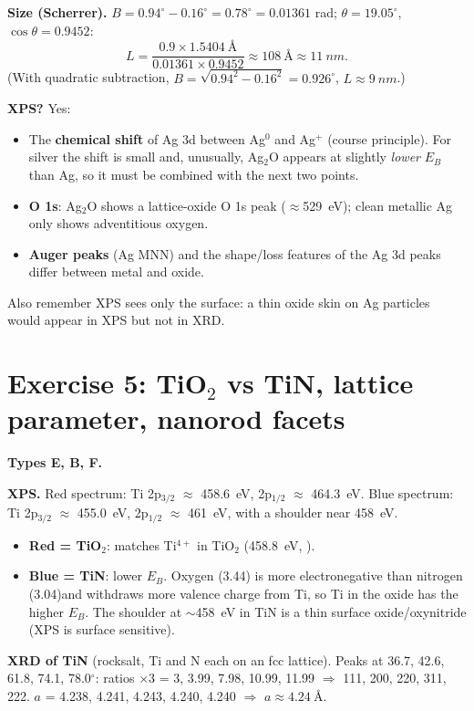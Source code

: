 \textbf{Size (Scherrer).} $B = 0.94^\circ - 0.16^\circ = 0.78^\circ = 0.01361$ rad; $\theta = 19.05^\circ$,
$\cos\theta = 0.9452$:
\[
L = \frac{0.9\times\SI{1.5404}{\angstrom}}{0.01361\times0.9452} \approx \SI{108}{\angstrom} \approx \boxed{\SI{11}{nm}}.
\]
(With quadratic subtraction, $B=\sqrt{0.94^2-0.16^2}=0.926^\circ$, $L\approx\SI{9}{nm}$\extra.)

\textbf{XPS?} Yes:
\begin{itemize}
  \item The \textbf{chemical shift} of Ag 3d between Ag$^0$ and Ag$^+$ (course principle). For silver the shift is small and,
        unusually, Ag$_2$O appears at slightly \emph{lower} $E_B$ than Ag\extra, so it must be combined with the next two points.
  \item \textbf{O 1s}: Ag$_2$O shows a lattice-oxide O 1s peak ($\approx$\SI{529}{eV}\extra); clean metallic Ag only shows
        adventitious oxygen.
  \item \textbf{Auger peaks} (Ag MNN) and the shape/loss features of the Ag 3d peaks differ between metal and oxide\extra.
\end{itemize}
Also remember XPS sees only the surface: a thin oxide skin on Ag particles would appear in XPS but not in XRD.

\section{Exercise 5: TiO$_2$ vs TiN, lattice parameter, nanorod facets}
\textbf{Types E, B, F.}

\textbf{XPS.} Red spectrum: Ti 2p$_{3/2}$ $\approx$ \SI{458.6}{eV}, 2p$_{1/2}$ $\approx$ \SI{464.3}{eV}\readoff.
Blue spectrum: Ti 2p$_{3/2}$ $\approx$ \SI{455.0}{eV}, 2p$_{1/2}$ $\approx$ \SI{461}{eV}\readoff, with a shoulder near
\SI{458}{eV}.
\begin{itemize}
  \item \textbf{Red = TiO$_2$}: matches Ti$^{4+}$ in TiO$_2$ (\SI{458.8}{eV}, ).
  \item \textbf{Blue = TiN}: lower $E_B$. Oxygen (3.44) is more electronegative than nitrogen (3.04)\extra and withdraws more
        valence charge from Ti, so Ti in the oxide has the higher $E_B$. The shoulder at $\sim$\SI{458}{eV} in TiN is a thin
        surface oxide/oxynitride (XPS is surface sensitive).
\end{itemize}

\textbf{XRD of TiN} (rocksalt, Ti and N each on an fcc lattice). Peaks at 36.7, 42.6, 61.8, 74.1, 78.0$^\circ$\readoff:
ratios $\times3$ = 3, 3.99, 7.98, 10.99, 11.99 $\Rightarrow$ 111, 200, 220, 311, 222.
$a$ = 4.238, 4.241, 4.243, 4.240, 4.240 $\Rightarrow$ $\boxed{a \approx \SI{4.24}{\angstrom}}$.

